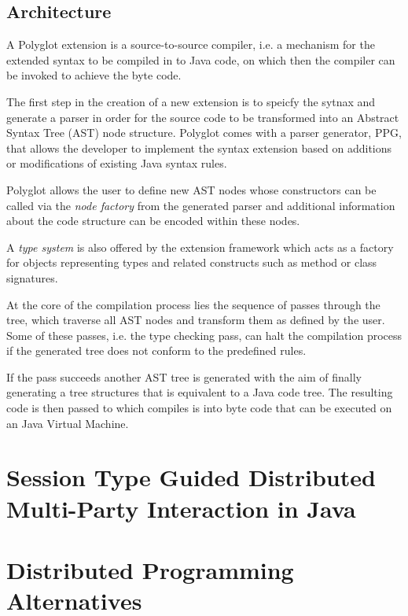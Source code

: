 \subsection{Architecture}
\label{subsec:polyglotarch}
A Polyglot extension is a source-to-source compiler, i.e. a mechanism for the extended syntax to be compiled in to Java code, on which then the  compiler can be invoked to achieve the byte code. 

The first step in the creation of a new extension is to speicfy the sytnax and generate a parser in order for the source code to be transformed into an Abstract Syntax Tree (AST) node structure. Polyglot comes with a parser generator, PPG, that allows the developer to implement the syntax extension based on additions or modifications of existing Java syntax rules\cite{polyglotpaper}.

Polyglot allows the user to define new AST nodes whose constructors can be called via the \textit{node factory} from the generated parser and additional information about the code structure can be encoded within these nodes. 

A \textit{type system} is also offered by the extension framework which acts as a factory for objects representing types and related constructs such as method or class signatures\cite{polyglotpaper}.

At the core of the compilation process lies the sequence of passes through the tree, which traverse all AST nodes and transform them as defined by the user. Some of these passes, i.e. the type checking pass, can halt the compilation process if the generated tree does not conform to the predefined rules. 

If the pass succeeds another AST tree is generated with the aim of finally generating a tree structures that is equivalent to a Java code tree. The resulting code is then passed to  which compiles is into byte code that can be executed on an Java Virtual Machine.



	
\section{Session Type Guided Distributed Multi-Party Interaction in Java}
\label{sec:mpstjava}
	
	
\section{Distributed Programming Alternatives}
\label{sec:alternatives}
	


